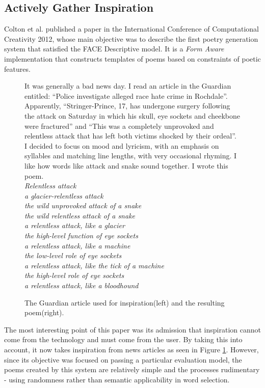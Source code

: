 \subsection{Actively Gather Inspiration}

Colton et al. published a paper in the International Conference of Computational Creativity 2012\cite{colton2012full}, whose main objective was to describe the first poetry generation system that satisfied the FACE Descriptive model\cite{colton2011computational}. It is a \textit{Form Aware}\cite{manurung2004evolutionary} implementation that constructs templates of poems based on constraints of poetic features. 

\begin{figure}[h!]
\begin{multicols}{2}
It was generally a bad news day. I read an article in
the Guardian entitled: “Police investigate alleged race
hate crime in Rochdale”. Apparently, “Stringer-Prince,
17, has undergone surgery following the attack on
Saturday in which his skull, eye sockets and
cheekbone were fractured” and “This was a
completely unprovoked and relentless attack that has
left both victims shocked by their ordeal”. I decided to
focus on mood and lyricism, with an emphasis on
syllables and matching line lengths, with very
occasional rhyming. I like how words like attack and
snake sound together. \columnbreak
I wrote this poem.\\
\textit{Relentless attack\\
a glacier-relentless attack\\
the wild unprovoked attack of a snake\\
the wild relentless attack of a snake\\
a relentless attack, like a glacier\\
the high-level function of eye sockets\\
a relentless attack, like a machine\\
the low-level role of eye sockets\\
a relentless attack, like the tick of a machine\\
the high-level role of eye sockets\\
a relentless attack, like a bloodhound
}
\end{multicols}
\caption{The Guardian article used for inspiration(left) and the resulting poem(right).}
\label{fig:face}
\end{figure}

The most interesting point of this paper was its admission that inspiration cannot come from the technology and must come from the user. By taking this into account, it now takes inspiration from news articles as seen in Figure \ref{fig:face}. However, since its objective was focused on passing a particular evaluation model, the poems created by this system are relatively simple and the processes rudimentary - using randomness rather than semantic applicability in word selection.

